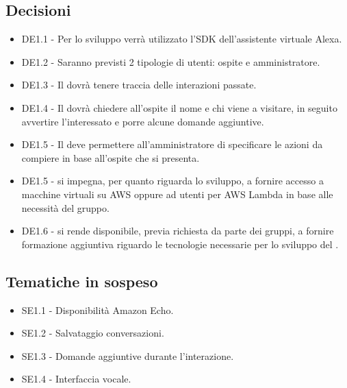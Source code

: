 \documentclass[a4paper,titlepage]{article}
\begin{document}
 \subsection{Decisioni}
 \begin{itemize}
  \item DE1.1 - Per lo sviluppo verrà utilizzato l'SDK dell'assistente virtuale Alexa.
  \item DE1.2 - Saranno previsti 2 tipologie di utenti: ospite e amministratore.
  \item DE1.3 - Il  dovrà tenere traccia delle interazioni passate.
  \item DE1.4 - Il  dovrà chiedere all'ospite il nome e chi viene a visitare, in seguito avvertire l'interessato e porre alcune domande aggiuntive.
  \item DE1.5 - Il  deve permettere all'amministratore di specificare le azioni da compiere in base all'ospite che si presenta.
  \item DE1.5 - \PROPONENTE{} si impegna, per quanto riguarda lo sviluppo, a fornire accesso a macchine virtuali su AWS oppure ad utenti per AWS Lambda in base alle necessità del gruppo.
  \item DE1.6 - \PROPONENTE{} si rende disponibile, previa richiesta da parte dei gruppi, a fornire formazione aggiuntiva riguardo le tecnologie necessarie per lo sviluppo del .
 \end{itemize}

\subsection{Tematiche in sospeso}
  \begin{itemize}
  \item SE1.1 - Disponibilità Amazon Echo.
  \item SE1.2 - Salvataggio conversazioni.
  \item SE1.3 - Domande aggiuntive durante l'interazione.
  \item SE1.4 - Interfaccia vocale.
  \end{itemize}
\end{document}

